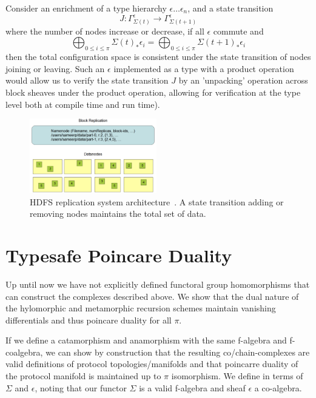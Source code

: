 \documentclass[runningheads]{llncs}
\begin{document}
Consider an enrichment of a type hierarchy $\epsilon \dots \epsilon_{n}$, and a state transition
\begin{equation}
J: \Gamma^\epsilon_{\Sigma(t)} \rightarrow \Gamma^\epsilon_{\Sigma(t + 1)} 
\end{equation}
where the number of nodes increase or decrease, if all $\epsilon$ commute and 
\begin{equation}
\bigoplus_{0 \leq i \leq \pi} \Sigma(t)_* \epsilon_i = \bigoplus_{0 \leq i \leq \pi} \Sigma(t+1)_* \epsilon_i
\end{equation}
then the total configuration space is consistent under the state transition of nodes joining or leaving. Such an $\epsilon$ implemented as a type with a product operation~\cite{ref_url2} would allow us to verify the state transition $J$ by an ’unpacking’ operation across block sheaves under the product operation, allowing for verification at the type level both at compile time and run time). 
\begin{figure}
\centering
\includegraphics[height=3.25cm,width=0.55\columnwidth]{HDFS-replication.png}
\caption{HDFS replication system architecture~\cite{ref_url7}. A state transition adding or removing nodes maintains the total set of data.} \label{fig2}
\end{figure}

\section{Typesafe Poincare Duality}
Up until now we have not explicitly defined functoral group homomorphisms that can construct the complexes described above. We show that the dual nature of the hylomorphic and metamorphic recursion schemes maintain vanishing differentials and thus poincare duality for all $\pi$.

If we define a catamorphism and anamorphism with the same f-algebra and f-coalgebra, we can show by construction that the resulting co/chain-complexes are valid definitions of protocol topologies/manifolds and that poincarre duality of the protocol manifold is maintained up to $\pi$ isomorphism. We define in terms of $\Sigma$ and $\epsilon$, noting that our functor $\Sigma$ is a valid f-algebra and sheaf $\epsilon$ a co-algebra.
\end{document}
